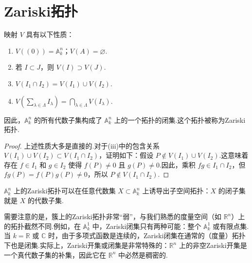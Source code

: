 \section{Zariski拓扑}

\begin{proposition}[Zariski拓扑]
映射 \(V\) 具有以下性质：
\begin{enumerate}
    \item \(V\left( (0) \right)  = {\mathbb{A}}_{k}^{n}\)；\(V\left( A \right)  = \varnothing\).
    \item 若 \(I \subset  J\)，则 \(V\left( I\right)  \supset  V\left( J\right)\).
    \item \(V\left( {{I}_{1} \cap  {I}_{2}}\right)  = V\left( {I}_{1}\right)  \cup  V\left( {I}_{2}\right)\).
    \item \(V\left( {\sum_{{\lambda  \in  \Lambda }}{I}_{\lambda }}\right)  = \bigcap_{{\lambda  \in  \Lambda }}V\left( {I}_{\lambda }\right)\).
\end{enumerate}
因此，\({\mathbb{A}}_{k}^{n}\) 的所有代数子集构成了 \({\mathbb{A}}_{k}^{n}\) 上的一个拓扑的闭集.这个拓扑被称为Zariski拓扑.
\end{proposition}

\begin{proof}
上述性质大多是直接的.对于(iii)中的包含关系 \(V\left( {I}_{1}\right)  \cup  V\left( {I}_{2}\right) \subset V\left( {{I}_{1} \cap  {I}_{2}}\right)\)，证明如下：假设 \(P \notin  V\left( {I}_{1}\right)  \cup  V\left( {I}_{2}\right)\).这意味着存在 \(f \in  {I}_{1}\) 和 \(g \in  {I}_{2}\) 使得 \(f\left( P\right)  \neq  0\) 且 \(g\left( P\right)  \neq  0\).因此，乘积 \({fg} \in  {I}_{1} \cap  {I}_{2}\)，但 \({fg}\left( P\right) = f(P)g(P) \neq  0\)，所以 \(P \notin  V\left( {{I}_{1} \cap  {I}_{2}}\right)\).
\end{proof}

\({\mathbb{A}}_{k}^{n}\) 上的Zariski拓扑可以在任意代数集 \(X \subset  {\mathbb{A}}_{k}^{n}\) 上诱导出子空间拓扑：\(X\) 的闭子集就是 \(X\) 的代数子集.

需要注意的是，簇上的Zariski拓扑非常“弱”，与我们熟悉的度量空间（如 \({\mathbb{R}}^{n}\)）上的拓扑截然不同.例如，在 \({\mathbb{A}}_{k}^{1}\) 中，Zariski闭集只有两种可能：整个 \({\mathbb{A}}_{k}^{1}\) 或有限点集.当 \(k = \mathbb{R}\) 或 \(\mathbb{C}\) 时，由于多项式函数是连续的，Zariski闭集在通常的（度量）拓扑下也是闭集.实际上，Zariski开集或闭集是非常特殊的：\({\mathbb{R}}^{n}\) 上的非空Zariski开集是一个真代数子集的补集，因此它在 \({\mathbb{R}}^{n}\) 中必然是稠密的.

